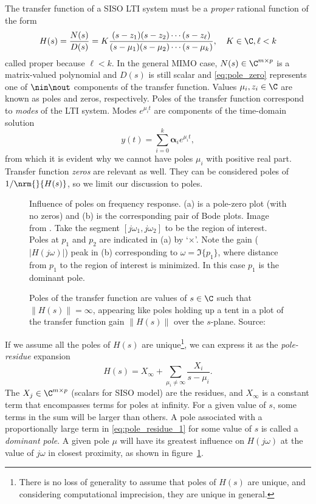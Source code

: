 The transfer function of a SISO LTI system must be a \emph{proper} rational function of the form 
\begin{equation}
H(s) = \frac{N(s)}{D(s)} = K \frac{(s-z_1)(s-z_2)\cdots(s-z_\ell)}{(s-\mu_1)(s-\mu_2)\cdots(s-\mu_k)},  \quad K\in\C, \ell<k 
\label{eq:pole_zero}
\end{equation}
 called proper because $\ell<k$.  In the general MIMO case, $N(s)\in\C^{m\times p}$ is a matrix-valued polynomial and $D(s)$ is still scalar and \eqref{eq:pole_zero} represents one of $\nin \nout$ components of the transfer function.  Values $\mu_i,z_i\in \C$ are known as poles and zeros, respectively.  Poles of the transfer function correspond to \emph{modes} of the LTI system.   Modes $e^{\mu_i t}$ are components of the time-domain solution 
\[
y(t) =\sum_{i=0}^k \bm{\alpha}_i e^{\mu_i t},
\]
from which it is evident why we cannot have poles $\mu_i$ with positive real part.
Transfer function \emph{zeros} are relevant as well.  They can be considered poles of $1/\nrm{}{H(s)}$, so we limit our discussion to poles.  


\begin{figure}[htb]
\centering
{} 
\caption{Influence of poles on frequency response.  (a) is a pole-zero plot (with no zeros) and (b) is the corresponding pair of Bode plots.  Image from \cite{MITlec2004}.  Take the segment $[j\omega_1,j\omega_2]$ to be the region of interest. Poles  at $p_1$ and $p_2$ are indicated in (a) by `$\times$'. Note the gain ($|H(j\omega)|$) peak in (b) corresponding to $\omega = \Im\{p_1\}$, where distance from $p_1$ to the region of interest is minimized.  In this case $p_1$ is the dominant pole.}
\label{fig:pole_influence}
\end{figure}


\begin{figure}
\centering
\caption{Poles of the transfer function are values of $s\in\C$ such that $\| H(s)\|=\infty$, appearing like poles holding up a tent in a plot of the transfer function gain $\| H(s)\|$ over the $s$-plane.  Source:\cite{tent_pic_source} }
\label{fig:tent}
\end{figure}
  

If we assume all the poles of $H(s)$ are unique\footnote{There is no loss of generality to assume that poles of $H(s)$ are unique, and considering computational imprecision, they are unique in general.}, we can express it as the  \emph{pole-residue} expansion 
\begin{equation}
          H(s) = X_\infty +
          \sum_{\mu_i\neq\infty}\frac{X_i}{s-\mu_i}.
	\label{eq:pole_residue_1}
  \end{equation}
The $X_j\in\C^{m\times p}$ (scalars for SISO model) are the residues, and $X_\infty$ is a constant term  that encompasses terms for poles at infinity.    For a given value of $s$, some terms in the sum will be larger than others.  A pole associated with a proportionally large term  in \eqref{eq:pole_residue_1} for some value of $s$ is called a \emph{dominant pole}.    A given pole $\mu$ will have its greatest influence on $H(j\omega)$ at the value of $j\omega$ in closest proximity, as shown in figure~\ref{fig:pole_influence}.    

